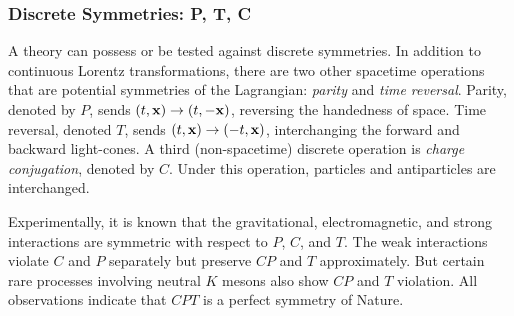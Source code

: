 \subsubsection{Discrete Symmetries: P, T, C}
\label{sec:discrete-symmetries}

A theory can possess or be tested against discrete symmetries. In addition to continuous Lorentz transformations, there are two other spacetime operations that are potential symmetries of the Lagrangian: \emph{parity} and \emph{time reversal}. Parity, denoted by $P$, sends $(t,\vb{x})\rightarrow(t,-\vb{x})$, reversing the handedness of space. Time reversal, denoted $T$, sends $(t,\vb{x})\rightarrow(-t,\vb{x})$, interchanging the forward and backward light-cones. A third (non-spacetime) discrete operation is \emph{charge conjugation}, denoted by $C$. Under this operation, particles and antiparticles are interchanged.

Experimentally, it is known that the gravitational, electromagnetic, and strong interactions are symmetric with respect to $P$, $C$, and $T$. The weak interactions violate $C$ and $P$ separately but preserve $CP$ and $T$ approximately. But certain rare processes involving neutral $K$ mesons also show $CP$ and $T$ violation. All observations indicate that $CPT$ is a perfect symmetry of Nature.

